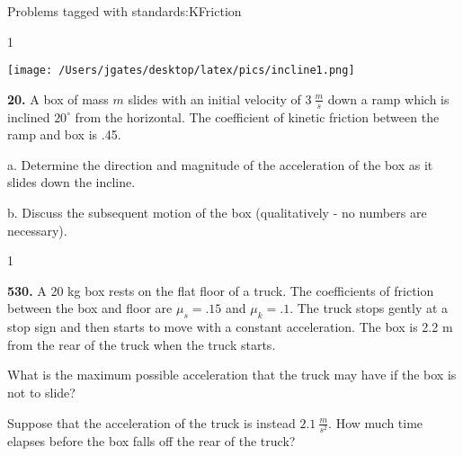 

{\Large Problems tagged with standards:}KFriction
\bigskip 

\AddToShipoutPicture*{\BackgroundPic}

\addtocounter {ProbNum} {1}

\begin{floatingfigure}[r]{.25\textwidth}
\texttt{[image: /Users/jgates/desktop/latex/pics/incline1.png]}
\end{floatingfigure} 

{\bf \Large{20.}} A box of mass ${m}$ slides with an initial velocity of ${3~\tfrac{m}{s}}$ down a ramp which is inclined ${20^\circ}$ from the horizontal.  The coefficient of kinetic friction between the ramp and box is .45.

\bigskip

\indent  a. Determine the direction and magnitude of the acceleration of the box as it slides down the incline. 

\bigskip 
b. Discuss the subsequent motion of the box (qualitatively - no numbers are necessary).

\bigskip 
\vspace{6mm}%

\AddToShipoutPicture*{\BackgroundPic}

\addtocounter {ProbNum} {1}

 
{\bf \Large{530.}} A 20 kg box rests on the flat floor of a truck. The coefficients of friction between the box and floor are ${\mu_s=.15}$ and ${\mu_k=.1}$. The truck stops gently at a stop sign and then starts to move with a constant acceleration. The box is 2.2 m from the rear of the truck when the truck starts.

\bigskip
What is the maximum possible acceleration that the truck may have if the box is not to slide?

\bigskip Suppose that the acceleration of the truck is instead ${2.1~\tfrac{m}{s^2}}$. How much time elapses before the box falls off the rear of the truck? 

